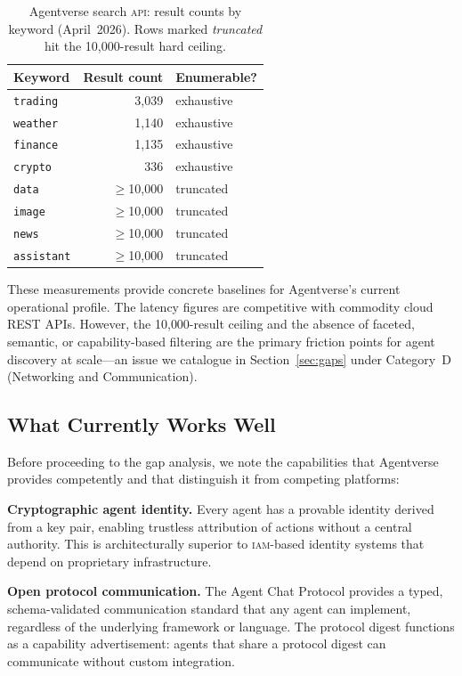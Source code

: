 \documentclass[twoside,11pt]{article}
\begin{document}
\begin{table}[h]
\small\centering
\caption{Agentverse search \textsc{api}: result counts by keyword (April~2026).
  Rows marked \emph{truncated} hit the 10{,}000-result hard ceiling.}
\label{tab:search}
\begin{tabular}{@{}lrl@{}}
\toprule
Keyword & Result count & Enumerable? \\
\midrule
\texttt{trading}    & 3{,}039       & exhaustive \\
\texttt{weather}    & 1{,}140       & exhaustive \\
\texttt{finance}    & 1{,}135       & exhaustive \\
\texttt{crypto}     &   336         & exhaustive \\
\texttt{data}       & $\ge$10{,}000 & truncated  \\
\texttt{image}      & $\ge$10{,}000 & truncated  \\
\texttt{news}       & $\ge$10{,}000 & truncated  \\
\texttt{assistant}  & $\ge$10{,}000 & truncated  \\
\bottomrule
\end{tabular}
\end{table}

These measurements provide concrete baselines for
Agentverse's current operational profile.  The latency figures
are competitive with commodity cloud REST APIs.  However, the
10{,}000-result ceiling and the absence of faceted, semantic, or
capability-based filtering are the primary friction points for
agent discovery at scale---an issue we catalogue in
Section~\ref{sec:gaps} under Category~D (Networking and
Communication).

\subsection{What Currently Works Well}
\label{subsec:strengths}

Before proceeding to the gap analysis, we note the capabilities that
Agentverse provides competently and that distinguish it from competing
platforms:

\textbf{Cryptographic agent identity.} Every agent has a provable identity
derived from a key pair, enabling trustless attribution of actions without a
central authority.  This is architecturally superior to \textsc{iam}-based
identity systems that depend on proprietary infrastructure.

\textbf{Open protocol communication.} The Agent Chat Protocol provides a typed,
schema-validated communication standard that any agent can implement,
regardless of the underlying framework or language.  The protocol digest
functions as a capability advertisement: agents that share a protocol digest
can communicate without custom integration.
\end{document}
